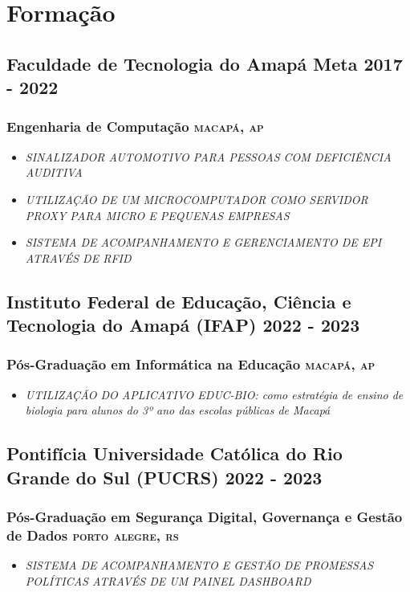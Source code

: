 \documentclass{article}
\newcommand{\rside}[1]{\hfill \normalfont\scshape\MakeLowercase{#1}}
\begin{document}
\section{\faGraduationCap\enspace Formação}
\subsection{Faculdade de Tecnologia do Amapá Meta  \rside{2017 - 2022}}
\subsubsection{Engenharia de Computação \rside{Macapá, AP}}
\begin{itemize}
  \item \textit{SINALIZADOR AUTOMOTIVO PARA PESSOAS COM DEFICIÊNCIA AUDITIVA}
  \item \textit{UTILIZAÇÃO DE UM MICROCOMPUTADOR COMO SERVIDOR PROXY PARA MICRO E PEQUENAS EMPRESAS}
  \item \textit{SISTEMA DE ACOMPANHAMENTO E GERENCIAMENTO DE EPI ATRAVÉS DE RFID}
\end{itemize}
\subsection{Instituto Federal de Educação, Ciência e Tecnologia do Amapá (IFAP) \rside{2022 - 2023}}
\subsubsection{Pós-Graduação em Informática na Educação \rside{Macapá, AP}}
\begin{itemize}
  \item \textit{UTILIZAÇÃO DO APLICATIVO EDUC-BIO: como estratégia de ensino de biologia para alunos do 3º ano das escolas públicas de Macapá}
\end{itemize}
\subsection{Pontifícia Universidade Católica do Rio Grande do Sul (PUCRS) \rside{2022 - 2023}}
\subsubsection{Pós-Graduação em Segurança Digital, Governança e Gestão de Dados \rside{Porto Alegre, RS}}
\begin{itemize}
  \item \textit{SISTEMA DE ACOMPANHAMENTO E GESTÃO DE PROMESSAS POLÍTICAS ATRAVÉS DE UM PAINEL DASHBOARD}
\end{itemize}
\end{document}
